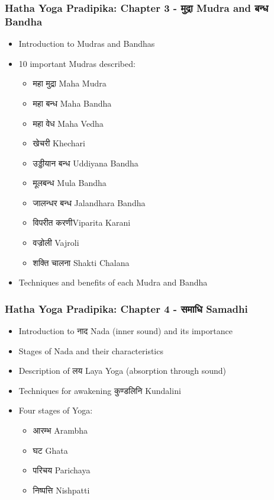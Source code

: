 \begin{frame}[fragile]\frametitle{Hatha Yoga Pradipika: Chapter 3 - मुद्रा  Mudra and बन्ध Bandha}
\begin{itemize}
    \item Introduction to Mudras and Bandhas
    \item 10 important Mudras described:
    \begin{itemize}
        \item महा मुद्रा Maha Mudra
        \item महा बन्ध Maha Bandha
        \item महा  वेध  Maha Vedha
        \item खेचरी Khechari
        \item उड्डीयान बन्ध Uddiyana Bandha
        \item मूलबन्ध Mula Bandha
        \item जालन्धर बन्ध Jalandhara Bandha
        \item विपरीत करणीViparita Karani
        \item वज्रोली Vajroli
        \item शक्ति चालना Shakti Chalana
    \end{itemize}
    \item Techniques and benefits of each Mudra and Bandha
\end{itemize}
\end{frame}



\begin{frame}[fragile]\frametitle{Hatha Yoga Pradipika: Chapter 4 - समाधि  Samadhi}
\begin{itemize}
    \item Introduction to नाद  Nada (inner sound) and its importance
    \item Stages of Nada and their characteristics
    \item Description of लय  Laya Yoga (absorption through sound)
    \item Techniques for awakening कुण्डलिनि  Kundalini
    \item Four stages of Yoga:
    \begin{itemize}
        \item आरम्भ  Arambha
        \item घट Ghata
        \item परिचय Parichaya
        \item निष्पत्ति Nishpatti
    \end{itemize}
\end{itemize}
\end{frame}

